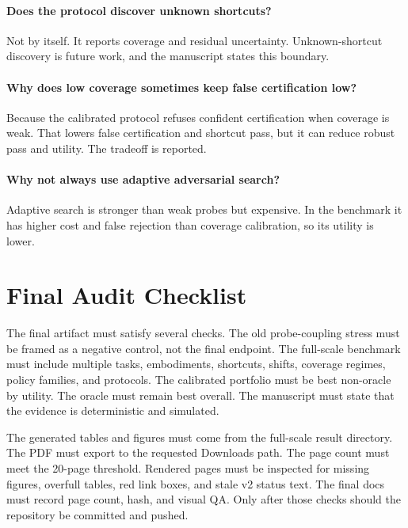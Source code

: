 \documentclass{article}
\begin{document}
\paragraph{Does the protocol discover unknown shortcuts?}
Not by itself. It reports coverage and residual uncertainty. Unknown-shortcut discovery is future work, and the manuscript states this boundary.

\paragraph{Why does low coverage sometimes keep false certification low?}
Because the calibrated protocol refuses confident certification when coverage is weak. That lowers false certification and shortcut pass, but it can reduce robust pass and utility. The tradeoff is reported.

\paragraph{Why not always use adaptive adversarial search?}
Adaptive search is stronger than weak probes but expensive. In the benchmark it has higher cost and false rejection than coverage calibration, so its utility is lower.

\clearpage
\section{Final Audit Checklist}

The final artifact must satisfy several checks. The old probe-coupling stress must be framed as a negative control, not the final endpoint. The full-scale benchmark must include multiple tasks, embodiments, shortcuts, shifts, coverage regimes, policy families, and protocols. The calibrated portfolio must be best non-oracle by utility. The oracle must remain best overall. The manuscript must state that the evidence is deterministic and simulated.

The generated tables and figures must come from the full-scale result directory. The PDF must export to the requested Downloads path. The page count must meet the 20-page threshold. Rendered pages must be inspected for missing figures, overfull tables, red link boxes, and stale v2 status text. The final docs must record page count, hash, and visual QA. Only after those checks should the repository be committed and pushed.
\end{document}
